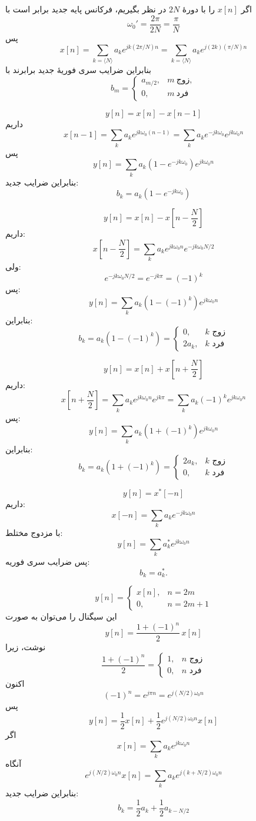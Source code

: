 اگر $x[n]$ را با دورهٔ $2N$ در نظر بگیریم، فرکانس پایه جدید برابر است با
\[
\omega_0'=\frac{2\pi}{2N}=\frac{\pi}{N}
\]
پس
\[
x[n]
=\sum_{k=\langle N\rangle} a_k e^{jk(2\pi/N)n}
=\sum_{k=\langle N\rangle} a_k e^{j(2k)(\pi/N)n}
\]
بنابراین ضرایب سری فوریهٔ جدید برابرند با
\[
b_m=
\begin{cases}
a_{m/2}, & m \ \text{زوج},\\
0, & m \ \text{فرد}
\end{cases}
\]

\bigskip

\[
y[n]=x[n]-x[n-1]
\]
داریم
\[
x[n-1]
=\sum_{k} a_k e^{jk\omega_0(n-1)}
=\sum_k a_k e^{-jk\omega_0}e^{jk\omega_0 n}
\]
پس
\[
y[n]
=\sum_k a_k\left(1-e^{-jk\omega_0}\right)e^{jk\omega_0 n}
\]
بنابراین ضرایب جدید:
\[
b_k=a_k\left(1-e^{-jk\omega_0}\right)
\]

\bigskip


\[
y[n]=x[n]-x\!\left[n-\frac{N}{2}\right]
\]
داریم:
\[
x\!\left[n-\frac{N}{2}\right]
=\sum_k a_k e^{jk\omega_0 n}e^{-jk\omega_0 N/2}
\]
ولی:
\[
e^{-jk\omega_0 N/2}
=e^{-jk\pi}
=(-1)^k
\]
پس:
\[
y[n]
=\sum_k a_k\left(1-(-1)^k\right)e^{jk\omega_0 n}
\]
بنابراین:
\[
b_k=a_k\left(1-(-1)^k\right)
=
\begin{cases}
0, & k \text{ زوج}\\
2a_k, & k \text{ فرد}
\end{cases}
\]

\bigskip


\[
y[n]=x[n]+x\!\left[n+\frac{N}{2}\right]
\]
داریم:
\[
x\!\left[n+\frac{N}{2}\right]
=\sum_k a_k e^{jk\omega_0 n}e^{jk\pi}
=\sum_k a_k(-1)^k e^{jk\omega_0 n}
\]
پس:
\[
y[n]
=\sum_k a_k\left(1+(-1)^k\right)e^{jk\omega_0 n}
\]
بنابراین:
\[
b_k=a_k\left(1+(-1)^k\right)
=
\begin{cases}
2a_k, & k \text{ زوج}\\
0, & k \text{ فرد}
\end{cases}
\]

\bigskip

\[
y[n]=x^*[-n]
\]
داریم:
\[
x[-n]
=\sum_k a_k e^{-jk\omega_0 n}
\]
با مزدوج مختلط:
\[
y[n]
=\sum_k a_k^* e^{jk\omega_0 n}
\]
پس ضرایب سری فوریه:
\[
b_k=a_k^*.
\]

\bigskip

\[
y[n]=
\begin{cases}
x[n], & n=2m\\
0, & n=2m+1
\end{cases}
\]
این سیگنال را می‌توان به صورت
\[
y[n]=\frac{1+(-1)^n}{2}\,x[n]
\]
نوشت، زیرا
\[
\frac{1+(-1)^n}{2}
=
\begin{cases}
1, & n \text{ زوج}\\
0, & n \text{ فرد}
\end{cases}
\]
اکنون
\[
(-1)^n=e^{j\pi n}=e^{j(N/2)\omega_0 n}
\]
پس
\[
y[n]
=\frac12 x[n]+\frac12 e^{j(N/2)\omega_0 n}x[n]
\]
اگر
\[
x[n]=\sum_k a_k e^{jk\omega_0 n}
\]
آنگاه
\[
e^{j(N/2)\omega_0 n}x[n]
=\sum_k a_k e^{j(k+N/2)\omega_0 n}
\]
بنابراین ضرایب جدید:
\[
b_k=\frac12 a_k+\frac12 a_{k-N/2}
\]
